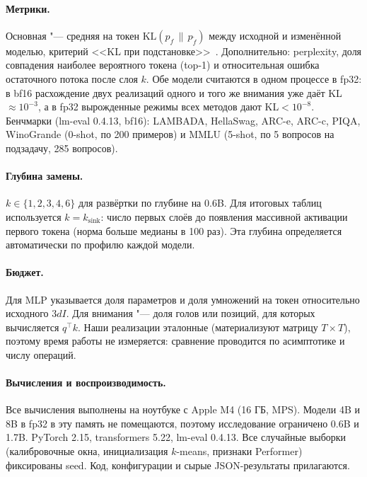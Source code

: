 \paragraph{Метрики.} Основная "--- средняя на токен
$\mathrm{KL}(p_f\,\|\,p_{\tilde f})$ между исходной и изменённой моделью,
критерий <<KL при подстановке>>~\cite{gao_notclean}. Дополнительно:
perplexity, доля совпадения наиболее вероятного токена (top-1) и
относительная ошибка остаточного потока после слоя $k$. Обе модели
считаются в одном процессе в fp32: в bf16 расхождение двух реализаций
одного и того же внимания уже даёт KL$\approx10^{-3}$, а в fp32
вырожденные режимы всех методов дают KL$<10^{-8}$. Бенчмарки
(lm-eval 0.4.13, bf16): LAMBADA, HellaSwag, ARC-e, ARC-c, PIQA,
WinoGrande (0-shot, по 200 примеров) и MMLU (5-shot, по 5 вопросов на
подзадачу, 285 вопросов).

\paragraph{Глубина замены.} $k\in\{1,2,3,4,6\}$ для развёртки по
глубине на 0.6B. Для итоговых таблиц используется $k=k_{\mathrm{sink}}$:
число первых слоёв до появления массивной активации первого токена
(норма больше медианы в 100 раз). Эта глубина определяется
автоматически по профилю каждой модели.

\paragraph{Бюджет.} Для MLP указывается доля параметров и доля
умножений на токен относительно исходного $3dI$. Для внимания "---
доля голов или позиций, для которых вычисляется $q^\top k$. Наши
реализации эталонные (материализуют матрицу $T\times T$), поэтому
время работы не измеряется: сравнение проводится по асимптотике и
числу операций.

\paragraph{Вычисления и воспроизводимость.} Все вычисления выполнены
на ноутбуке с Apple M4 (16 ГБ, MPS). Модели 4B и 8B в fp32 в эту память не
помещаются, поэтому исследование ограничено 0.6B и 1.7B. PyTorch 2.15,
transformers 5.22, lm-eval 0.4.13. Все случайные выборки (калибровочные
окна, инициализация $k$-means, признаки Performer) фиксированы seed. Код,
конфигурации и сырые JSON-результаты прилагаются.
